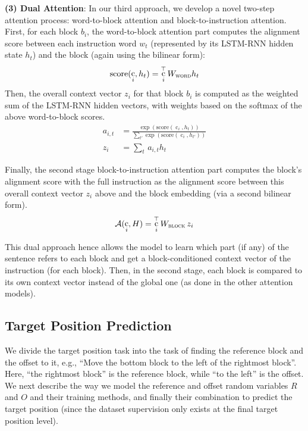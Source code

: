 \documentclass[letterpaper]{article} %
\DeclareMathOperator{\embb}{c}
\begin{document}
\textbf{(3) Dual Attention}:
In our third approach, we develop a novel two-step attention process: word-to-block attention and block-to-instruction attention.
First, for each block $b_i$, the word-to-block attention part computes the alignment score between each instruction word $w_t$ (represented by its LSTM-RNN hidden state $h_t$) and the block (again using the bilinear form):
\begin{equation}
\text{score}(\embb_i, h_t) = \embb_i^{\top} W_{\textsc{word}} h_t
\end{equation}
Then, the overall context vector $z_i$ for that block $b_i$ is computed as the weighted sum of the LSTM-RNN hidden vectors, with weights based on the softmax of the above word-to-block scores.
\begin{align}
a_{i,t} & = \frac{\exp \left( \text{score}(\embb_i, h_t) \right) }{\sum_{t'} \exp \left( \text{score}(\embb_i, h_{t'}) \right) } \\
z_i & = \sum_t\, a_{i,t} h_t
\end{align}

Finally, the second stage block-to-instruction attention part computes the block's alignment score with the full instruction as the alignment score between this overall context vector $z_i$ above and the block embedding (via a second bilinear form).
\begin{equation}
\mathcal{A}(\embb_i, H) = \embb_i^{\top} W_{\textsc{block}} \, z_i
\end{equation}

This dual approach hence allows the model to learn which part (if any) of the sentence refers to each block and get a block-conditioned context vector of the instruction (for each block). Then, in the second stage, each block is compared to its own context vector instead of the global one (as done in the other attention models).


\subsection{Target Position Prediction}

We divide the target position task into the task of finding the reference block and the offset to it, e.g., ``Move the bottom block to the left of the rightmost block''. Here, ``the rightmost block'' is the reference block, while ``to the left'' is the offset.
We next describe the way we model the reference and offset random variables $R$ and $O$ and their training methods, and finally their combination to predict the target position (since the dataset supervision only exists at the final target position level).
\end{document}
